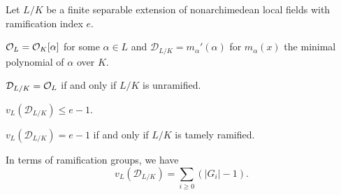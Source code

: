 \documentclass[11pt]{article}
\newcommand{\D}{\mathcal{D}}
\begin{document}
\begin{proposition}
Let $L/K$ be a finite separable extension of nonarchimedean local fields with ramification index $e$.
\begin{enum}{\roman}
\item $\mathcal{O}_L=\mathcal{O}_K[\alpha]$ for some $\alpha\in L$ and $\D_{L/K}=m_{\alpha}'(\alpha)$ for $m_{\alpha}(x)$ the minimal polynomial of $\alpha$ over $K$.

\item $\D_{L/K}=\O_L$ if and only if $L/K$ is unramified.

\item $v_L(\D_{L/K})\leq e-1$.

\item $v_L(\D_{L/K})=e-1$ if and only if $L/K$ is tamely ramified.
\end{enum}
\end{proposition}	

In terms of ramification groups, we have 
$$v_L(\D_{L/K})=\sum_{i\geq0}(|G_i|-1).$$
\end{document}
